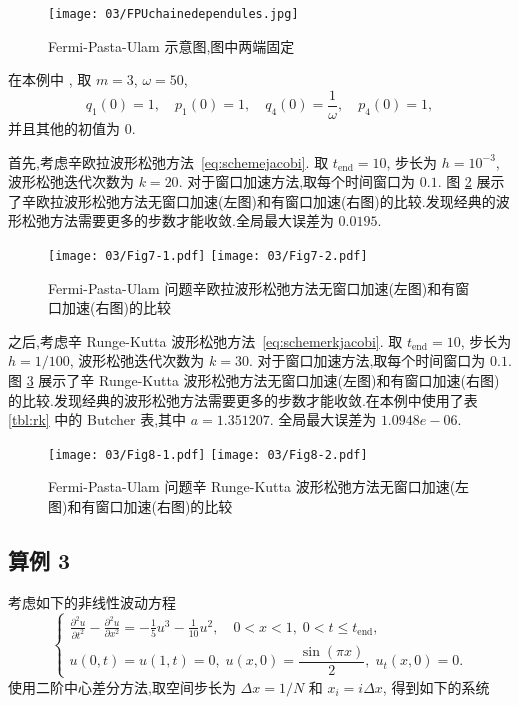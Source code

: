 \begin{figure}[h!]
  \centering
  \texttt{[image: 03/FPUchainedependules.jpg]}
  \caption{Fermi-Pasta-Ulam 示意图,图中两端固定}
  \label{fig:fpu}
\end{figure}

在本例中 \cite{hairer2006geometric}, 取 $m=3$, $\omega = 50$,
\begin{equation*}
  q_1(0) = 1, \quad p_1(0) = 1, \quad q_4(0) = \frac{1}{\omega}, \quad p_4(0) = 1,
\end{equation*}
并且其他的初值为 $0$.

首先,考虑辛欧拉波形松弛方法~\eqref{eq:schemejacobi}. 取 $t_{\text{end}} = 10$, 步长为 $h = 10^{-3}$, 波形松弛迭代次数为 $k=20$. 对于窗口加速方法,取每个时间窗口为 $0.1$. 图 \ref{fig:ex2seucom} 展示了辛欧拉波形松弛方法无窗口加速(左图)和有窗口加速(右图)的比较.发现经典的波形松弛方法需要更多的步数才能收敛.全局最大误差为 $0.0195$.

\begin{figure}[h!]
  \centering
  \texttt{[image: 03/Fig7-1.pdf]}
  \texttt{[image: 03/Fig7-2.pdf]}
  \caption{Fermi-Pasta-Ulam 问题辛欧拉波形松弛方法无窗口加速(左图)和有窗口加速(右图)的比较}
  \label{fig:ex2seucom}
\end{figure}

之后,考虑辛 Runge-Kutta 波形松弛方法~\eqref{eq:schemerkjacobi}. 取 $t_{\text{end}} = 10$, 步长为 $h = 1/100$, 波形松弛迭代次数为 $k=30$. 对于窗口加速方法,取每个时间窗口为 $0.1$. 图 \ref{fig:ex2srkcom} 展示了辛 Runge-Kutta 波形松弛方法无窗口加速(左图)和有窗口加速(右图)的比较.发现经典的波形松弛方法需要更多的步数才能收敛.在本例中使用了表 \ref{tbl:rk} 中的 Butcher 表,其中 $a = 1.351207$. 全局最大误差为 $1.0948e-06$.

\begin{figure}[h!]
  \centering
  \texttt{[image: 03/Fig8-1.pdf]}
  \texttt{[image: 03/Fig8-2.pdf]}
  \caption{Fermi-Pasta-Ulam 问题辛 Runge-Kutta 波形松弛方法无窗口加速(左图)和有窗口加速(右图)的比较}
  \label{fig:ex2srkcom}
\end{figure}

\subsection*{算例 3}
考虑如下的非线性波动方程 \cite{wu2013struc}
\begin{equation}\label{eq:nonlinwave}
  \left \{ \begin{array}{l}
      \displaystyle \frac{\partial^2 u }{\partial t^2}
      - \frac{\partial^2 u}{\partial x^2}
      = -\frac{1}{5} u^3 - \frac{1}{10} u^2, \quad 0<x<1, \; 0<t \leq t_{\text{end}},\\
      u(0,t) = u(1,t) = 0, \; u(x, 0) = \dfrac{\sin(\pi x)}{2}, \; u_t (x, 0) = 0.
    \end{array} \right.
\end{equation}
使用二阶中心差分方法,取空间步长为 $\Delta x = 1/N$ 和 $x_i = i \Delta x$, 得到如下的系统

